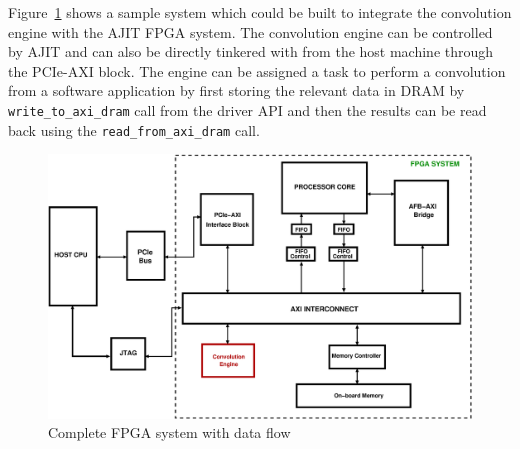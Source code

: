\onehalfspacing
Figure~\ref{full system integrated with convolution engine} shows a sample system which could be built to integrate the convolution engine
with the AJIT FPGA system. The convolution engine can be controlled by AJIT and can also be directly tinkered with from the host machine
through the PCIe-AXI block. The engine can be assigned a task to perform a convolution from a software application by first storing the
relevant data in DRAM by \verb|write_to_axi_dram| call from the driver API and then the results can be read back using the
\verb|read_from_axi_dram| call.

\begin{figure}[H]
\centering
\includegraphics[width=\textwidth]{eps_pdf_sources/convolution_engine/Full_system_integrated_with_core}
\caption{Complete FPGA system with data flow}
\label{full system integrated with convolution engine}
\end{figure}

\doublespacing
